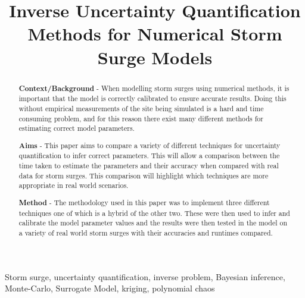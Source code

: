 \documentclass[12pt,a4paper]{article}
\title{Inverse Uncertainty Quantification Methods for Numerical Storm Surge Models}
\author{} %
\date{}
\begin{document}
\maketitle

\begin{abstract}
	
{\bf Context/Background} - 	When modelling storm surges using numerical methods, it is important that the model is correctly calibrated to ensure accurate results. Doing this without empirical measurements of the site being simulated is a hard and time consuming problem, and for this reason there exist many different methods for estimating correct model parameters.

{\bf Aims} - This paper aims to compare a variety of different techniques for uncertainty quantification to infer correct parameters. This will allow a comparison between the time taken to estimate the parameters and their accuracy when compared with real data for storm surges. This comparison will highlight which techniques are more appropriate in real world scenarios.

{\bf Method} - The methodology used in this paper was to implement three different techniques one of which is a hybrid of the other two. These were then used to infer and calibrate the model parameter values and the results were then tested in the model on a variety of real world storm surges with their accuracies and runtimes compared.
\end{abstract}

\begin{keywords}
Storm surge, uncertainty quantification, inverse problem, Bayesian inference, Monte-Carlo, Surrogate Model, kriging, polynomial chaos
\end{keywords}
\end{document}
